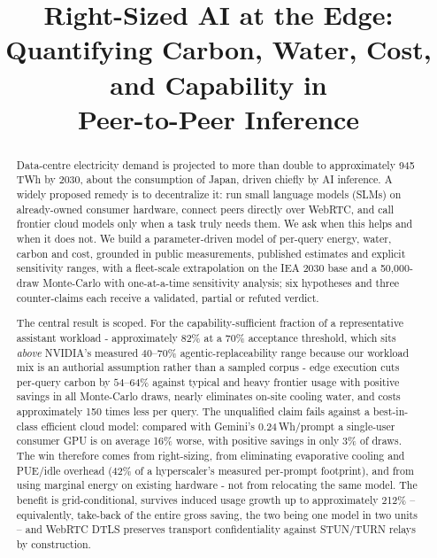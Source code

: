 \documentclass[conference]{IEEEtran}
\begin{document}
\title{Right-Sized AI at the Edge:\\
Quantifying Carbon, Water, Cost, and Capability in\\
Peer-to-Peer Inference}

\author{
}

\maketitle

\begin{abstract}
Data-centre electricity demand is projected to more than double to
approximately 945\,TWh by 2030, about the consumption of Japan, driven chiefly
by AI inference. A widely proposed remedy is to decentralize it: run small
language models (SLMs) on already-owned consumer hardware, connect peers
directly over WebRTC, and call frontier cloud models only when a task truly
needs them. We ask when this helps and when it does not. We build a
parameter-driven model of per-query energy, water, carbon and cost, grounded in
public measurements, published estimates and explicit sensitivity ranges, with a
fleet-scale extrapolation on the IEA 2030 base and a 50{,}000-draw Monte-Carlo
with one-at-a-time sensitivity analysis; six hypotheses and three counter-claims
each receive a validated, partial or refuted verdict.

The central result is scoped. For the capability-sufficient fraction of a
representative assistant workload - approximately 82\% at a 70\% acceptance
threshold, which sits \emph{above} NVIDIA's measured 40--70\% agentic-replaceability
range because our workload mix is an authorial assumption rather than a sampled
corpus - edge execution cuts per-query carbon by $54$--$64\%$ against typical and
heavy frontier usage with positive savings in all Monte-Carlo draws, nearly
eliminates on-site cooling water, and costs approximately 150 times less per
query. The unqualified claim fails against a best-in-class efficient cloud
model: compared with Gemini's 0.24\,Wh/prompt a single-user consumer GPU is on
average 16\% worse, with positive savings in only 3\% of draws. The win
therefore comes from right-sizing, from eliminating evaporative cooling and
PUE/idle overhead ($42\%$ of a hyperscaler's measured per-prompt footprint), and
from using marginal energy on existing hardware - not from relocating the same
model. The benefit is grid-conditional, survives induced usage growth up to
approximately 212\% -- equivalently, take-back of the entire gross saving, the
two being one model in two units -- and WebRTC DTLS preserves transport
confidentiality against
STUN/TURN relays by construction.


\end{abstract}
\end{document}

